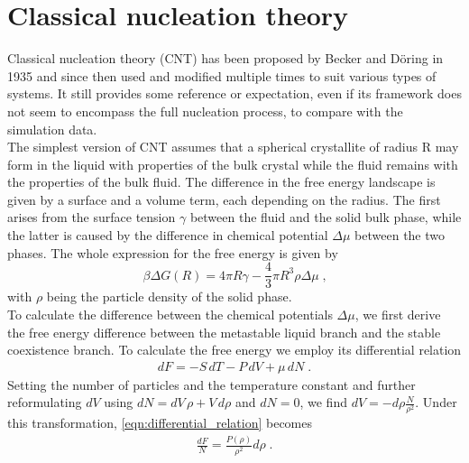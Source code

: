 
\section{Classical nucleation theory }
\label{sec:CNT}
Classical nucleation theory (CNT) has been proposed by Becker and Döring in 1935\cite{Becker1935} and since then used and modified multiple times to suit various types of systems. It still provides some reference or expectation, even if its framework does not seem to encompass the full nucleation process, to compare with the simulation data.\\

The simplest version of CNT assumes that a spherical crystallite of radius R may form in the liquid with properties of the bulk crystal while the fluid remains with the properties of the bulk fluid. The difference in the free energy landscape is given by a surface and a volume term, each depending on the radius. The first arises from the surface tension $\gamma$ between the fluid and the solid bulk phase, while the latter is caused by the difference in chemical potential $\Delta \mu$ between the two phases. The whole expression for the free energy is given by
\begin{equation}
\label{eqn:free_energy}
\beta \Delta G(R) =4 \pi R \gamma -\frac{4}{3} \pi R^3 \rho \Delta \mu  \; \text{,}
\end{equation}
with $\rho$ being the particle density of the solid phase.\\

To calculate the difference between the chemical potentials $\Delta \mu $, we first derive the free energy difference between the metastable liquid branch and the stable coexistence branch. To calculate the free energy we employ its differential relation
\begin{align}
\label{eqn:differential_relation}
dF = -S  \, dT -P \, dV + \mu  \, dN \; \text{.}
\end{align}
Setting the number of particles and the temperature constant and further reformulating $dV$ using \linebreak[1] $dN = dV  \, \rho + V  \, d\rho  $ and $dN = 0 $, we find $ dV = -d\rho \frac{N}{\rho^2}$. Under this transformation, \autoref{eqn:differential_relation} becomes
\begin{align}
\label{eqn:df_relation}
\frac{dF}{N} = \frac{P(\rho)}{\rho^2} d\rho \; \text{.}
\end{align}

